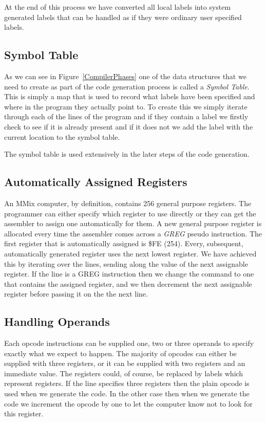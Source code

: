 \documentclass[a4paper,11pt]{report}
\begin{document}
At the end of this process we have converted all local labels into system generated labels that can be handled as if they were ordinary user specified labels.
\subsection{Symbol Table}
As we can see in Figure~\ref{CompilerPhases} one of the data structures that we need to create as part of the code generation process is called a \textit{Symbol Table}. This is simply a map that is used to record what labels have been specified and where in the program they actually point to. To create this we simply iterate through each of the lines of the program and if they contain a label we firstly check to see if it is already present and if it does not we add the label with the current location to the symbol table.

The symbol table is used extensively in the later steps of the code generation.
\subsection{Automatically Assigned Registers}
An MMix computer, by definition, contains 256 general purpose registers. The programmer can either specify which register to use directly or they can get the assembler to assign one automatically for them. A new general purpose register is allocated every time the assembler comes across a \textit{GREG} pseudo instruction. The first register that is automatically assigned is \$FE (254). Every, subsequent, automatically generated register uses the next lowest register. We have achieved this by iterating over the lines, sending along the value of the next assignable register. If the line is a GREG instruction then we change the command to one that contains the assigned register, and we then decrement the next assignable register before passing it on the the next line.
\subsection{Handling Operands}
Each opcode instructions can be supplied one, two or three operands to specify exactly what we expect to happen. The majority of opcodes can either be supplied with three registers, or it can be supplied with two registers and an immediate value. The registers could, of course, be replaced by labels which represent registers. If the line specifies three registers then the plain opcode is used when we generate the code. In the other case then when we generate the code we increment the opcode by one to let the computer know not to look for this register.
\end{document}
